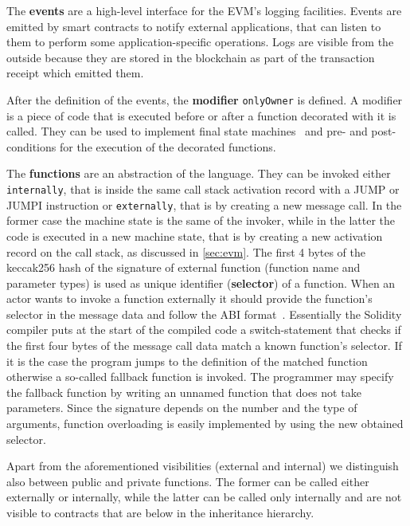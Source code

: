 The \textbf{events} are a high-level interface for the EVM's logging 
facilities. Events are emitted by smart contracts to notify external 
applications, that can listen to them to perform some application-specific
operations. Logs are visible from the outside because they are stored
in the blockchain as part of the transaction receipt which emitted them.

After the definition of the events, the \textbf{modifier} \verb|onlyOwner| is
defined. A modifier is a piece of code that is executed before or after a 
function decorated with it is called. They can be used to implement final
state machines~\cite{bib:solidity-docs} and pre- and post-conditions for the
execution of the decorated functions.

The \textbf{functions} are an abstraction of the language. They can be invoked 
either \texttt{internally}, that is inside the same call stack activation record
with a JUMP or JUMPI instruction or \texttt{externally}, that is by creating a
new message call. In the former case the machine state is the same of the
invoker, while in the latter the code is executed in a new machine state, that
is by creating a new activation record on the call stack, as discussed in
\autoref{sec:evm}.
The first 4 bytes of the keccak256 hash of the signature of external function
(function name and parameter types) is used as unique identifier
(\textbf{selector}) of a function. When an actor wants to invoke a function
externally it should provide the function's selector in the message data and
follow the ABI format~\cite{bib:solidity-docs}.
Essentially the Solidity compiler puts at the start of the compiled code a
switch-statement that checks if the first four bytes of the message call data
match a known function's selector. If it is the case the program jumps to the
definition of the matched function otherwise a so-called fallback function is 
invoked.
The programmer may specify the fallback function by writing an unnamed function
that does not take parameters. Since the signature depends on the number and
the type of arguments, function overloading is easily implemented by using
the new obtained selector.

Apart from the aforementioned visibilities (external and internal)
we distinguish also between public and private functions. The former can be
called either externally or internally, while the latter can be called only 
internally and are not visible to contracts that are below in the inheritance
hierarchy.

